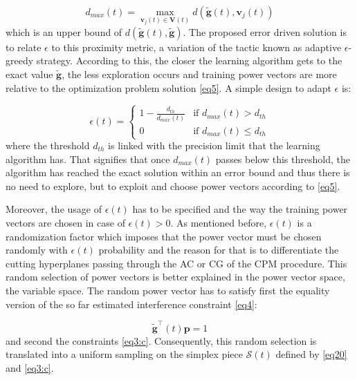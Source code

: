 \documentclass[journal]{IEEEtran}
\begin{document}
\begin{equation}
d_{max}(t)=\max\limits_{\mathbf{v}_{j}(t) \in \mathbf{V}(t)}d(\mathbf{\tilde{g}}(t),\mathbf{v}_{j}(t))
\label{eq18}
\end{equation}
which is an upper bound of $d(\mathbf{\tilde{g}}(t),\mathbf{\tilde{g}})$. The proposed error driven solution is to relate $\epsilon$ to this proximity metric, a variation of the tactic known as adaptive $\epsilon$-greedy strategy. According to this, the closer the learning algorithm gets to the exact value $\mathbf{\tilde{g}}$, the less exploration occurs and training power vectors are more relative to the optimization problem solution \eqref{eq5}. A simple design to adapt $\epsilon$ is:

\begin{equation}
\epsilon(t)=\left\{
  \begin{array}{cc}
   1-\frac{d_{th}}{d_{max}(t)} & \mbox{if $d_{max}(t) > d_{th}$}\\
   0 & \mbox{if $d_{max}(t) \leq d_{th}$}
  \end{array}
  \right.
\label{eq19}
\end{equation}
where the threshold $d_{th}$ is linked with the precision limit that the learning algorithm has. That signifies that once $d_{max}(t)$ passes below this threshold, the algorithm has reached the exact solution within an error bound and thus there is no need to explore, but to exploit and choose power vectors according to \eqref{eq5}.

Moreover, the usage of $\epsilon(t)$ has to be specified and the way the training power vectors are chosen in case of $\epsilon(t)>0$. As mentioned before, $\epsilon(t)$ is a randomization factor which imposes that the power vector must be chosen randomly with $\epsilon(t)$ probability and the reason for that is to differentiate the cutting hyperplanes passing through the AC or CG of the CPM procedure. This random selection of power vectors is better explained in the power vector space, the variable space. The random power vector has to satisfy first the equality version of the so far estimated interference constraint \eqref{eq4}:

\begin{equation}
\mathbf{\tilde{g}^\intercal}(t)\mathbf{p}=1
\label{eq20}
\end{equation}
and second the constraints \eqref{eq3:c}. Consequently, this random selection is translated into a uniform sampling on the simplex piece $\mathcal{S}(t)$ defined by \eqref{eq20} and \eqref{eq3:c}.
\end{document}
